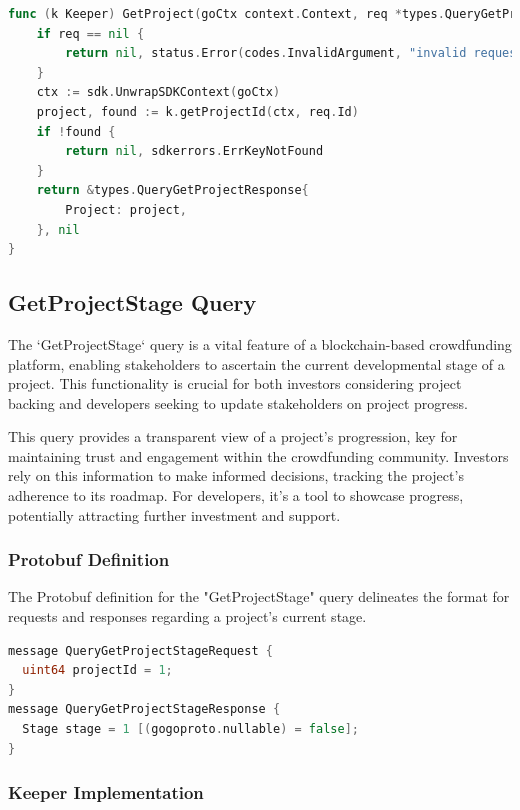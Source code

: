 \begin{lstlisting}[language=go, caption={Keeper Implementation for GetProject Query}]
func (k Keeper) GetProject(goCtx context.Context, req *types.QueryGetProjectRequest) (*types.QueryGetProjectResponse, error) {
	if req == nil {
		return nil, status.Error(codes.InvalidArgument, "invalid request")
	}
	ctx := sdk.UnwrapSDKContext(goCtx)
	project, found := k.getProjectId(ctx, req.Id)
	if !found {
		return nil, sdkerrors.ErrKeyNotFound
	}
	return &types.QueryGetProjectResponse{
		Project: project,
	}, nil
}
\end{lstlisting}


\subsection{GetProjectStage Query}

The `GetProjectStage` query is a vital feature of a blockchain-based crowdfunding platform, enabling stakeholders to ascertain the current developmental stage of a project. This functionality is crucial for both investors considering project backing and developers seeking to update stakeholders on project progress.

This query provides a transparent view of a project's progression, key for maintaining trust and engagement within the crowdfunding community. Investors rely on this information to make informed decisions, tracking the project's adherence to its roadmap. For developers, it's a tool to showcase progress, potentially attracting further investment and support.

\subsubsection{Protobuf Definition}

The Protobuf definition for the "GetProjectStage" query delineates the format for requests and responses regarding a project's current stage.


\begin{lstlisting}[language=go, caption={Protobuf Definition for GetProjectStage Query}]
message QueryGetProjectStageRequest {
  uint64 projectId = 1;
}
message QueryGetProjectStageResponse {
  Stage stage = 1 [(gogoproto.nullable) = false];
}
\end{lstlisting}

\subsubsection{Keeper Implementation}

